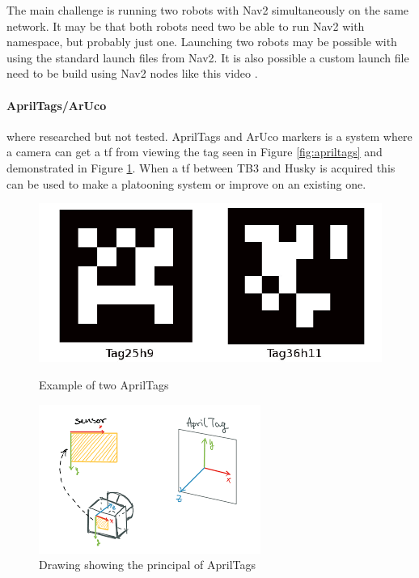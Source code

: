 The main challenge is running two robots with Nav2 simultaneously on the same network. It may be that both robots need two be able to run Nav2 with namespace, but probably just one. Launching two robots may be possible with using the standard launch files from Nav2. It is also possible a custom launch file need to be build using Nav2 nodes like this video \cite{MultiRobotNav2}.
   

\paragraph{AprilTags/ArUco} where researched but not tested. AprilTags and ArUco markers is a system where a camera can get a tf from viewing the tag seen in Figure \ref{fig:apriltags} and demonstrated in Figure \ref{fig:apriltag_principal}. When a tf between TB3 and Husky is acquired this can be used to make a platooning system or improve on an existing one. 

\begin{figure}[H]
  \centering
  \begin{minipage}[b]{0.4\textwidth}
    \includegraphics[width=\textwidth]{Figures/images/apriltags.png}
    \caption{Example of two AprilTags}
    \label{fig:apriltags}
  \end{minipage}
  \hfill
  \begin{minipage}[b]{0.4\textwidth}
    \includegraphics[width=\textwidth]{Figures/images/apriltag_prinsipal.png}
    \caption{Drawing showing the principal of AprilTags}
    \label{fig:apriltag_principal}
  \end{minipage}
\end{figure}
